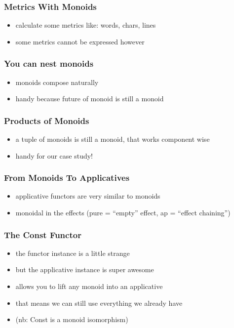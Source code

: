 \documentclass[aspectratio=169]{beamer}
\begin{document}
\begin{frame}
  \frametitle{Metrics With Monoids}
  \begin{itemize}
  \item calculate some metrics like: words, chars, lines
  \item some metrics cannot be expressed however
  \end{itemize}
\end{frame}

\begin{frame}
  \frametitle{You can nest monoids}
  \begin{itemize}
  \item monoids compose naturally
  \item handy because future of monoid is still a monoid
  \end{itemize}
\end{frame}

\begin{frame}
  \frametitle{Products of Monoids}
  \begin{itemize}
  \item a tuple of monoids is still a monoid, that works component wise
  \item handy for our case study!
  \end{itemize}
\end{frame}

\begin{frame}
  \frametitle{From Monoids To Applicatives}
  \begin{itemize}
  \item applicative functors are very similar to monoids
  \item monoidal in the effects (pure = ``empty'' effect, ap = ``effect chaining'')
  \end{itemize}
\end{frame}

\begin{frame}
  \frametitle{The Const Functor}
  \begin{itemize}
  \item the functor instance is a little strange
  \item but the applicative instance is super awesome
  \item allows you to lift any monoid into an applicative
  \item that means we can still use everything we already have
  \item (nb: Const is a monoid isomorphism)
  \end{itemize}
\end{frame}
\end{document}
